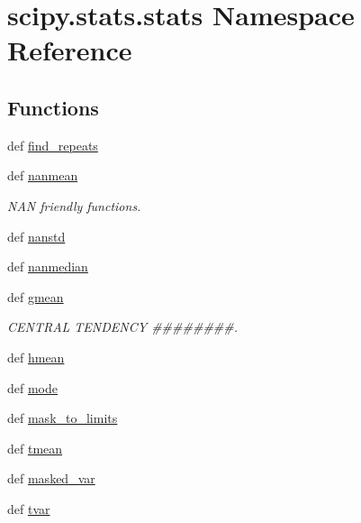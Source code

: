 \hypertarget{namespacescipy_1_1stats_1_1stats}{}\section{scipy.\+stats.\+stats Namespace Reference}
\label{namespacescipy_1_1stats_1_1stats}
\subsection*{Functions}
\begin{DoxyCompactItemize}
\item 
def \hyperlink{namespacescipy_1_1stats_1_1stats_a69c44b392136bf66869061d07d655f3e}{find\+\_\+repeats}
\item 
def \hyperlink{namespacescipy_1_1stats_1_1stats_ab1638103f489bcc1a2fe06c806413da8}{nanmean}
\begin{DoxyCompactList}\small\item\em N\+A\+N friendly functions. \end{DoxyCompactList}\item 
def \hyperlink{namespacescipy_1_1stats_1_1stats_a4c3bc74fa7ca3f5f0d0cfbb5f97b79c3}{nanstd}
\item 
def \hyperlink{namespacescipy_1_1stats_1_1stats_a9ea387540ef1b6b56a62088d3b38b3cb}{nanmedian}
\item 
def \hyperlink{namespacescipy_1_1stats_1_1stats_a48fb267e94c5eb1b26a5c10776f3e2b4}{gmean}
\begin{DoxyCompactList}\small\item\em C\+E\+N\+T\+R\+A\+L T\+E\+N\+D\+E\+N\+C\+Y \#\#\#\#\#\#\#\#. \end{DoxyCompactList}\item 
def \hyperlink{namespacescipy_1_1stats_1_1stats_aac6c16e0d657f32648fc7c0e8a367336}{hmean}
\item 
def \hyperlink{namespacescipy_1_1stats_1_1stats_a82088ab884e71ebc98dc6b05d1c0a6a0}{mode}
\item 
def \hyperlink{namespacescipy_1_1stats_1_1stats_ab8a3087296c7f76c65fc2fa68a55e523}{mask\+\_\+to\+\_\+limits}
\item 
def \hyperlink{namespacescipy_1_1stats_1_1stats_a3826e86ff6b9eb4b4596335bd2a0f47d}{tmean}
\item 
def \hyperlink{namespacescipy_1_1stats_1_1stats_a3bc0c6247ce0aa3bdbe9bf5310d336c8}{masked\+\_\+var}
\item 
def \hyperlink{namespacescipy_1_1stats_1_1stats_a83ca47e55ba2a93bb820b00ccb237d67}{tvar}

\end{DoxyCompactItemize}
